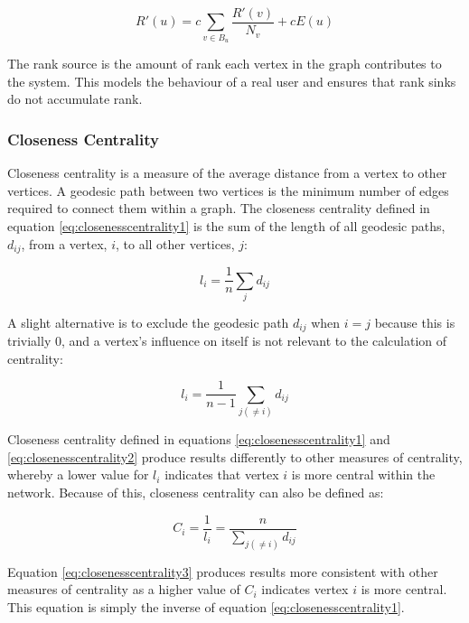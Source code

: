 \begin{equation}
R'(u) = c \sum_{v \in B_u} \frac{R'(v)}{N_v} + cE(u)
\label{eq:pagerank}
\end{equation}

The rank source is the amount of rank each vertex in the graph contributes to the system. This models the behaviour of a real user and ensures that rank sinks do not accumulate rank.

\subsubsection{Closeness Centrality}
Closeness centrality is a measure of the average distance from a vertex to other vertices. A geodesic path between two vertices is the minimum number of edges required to connect them within a graph. The closeness centrality defined in equation \ref{eq:closenesscentrality1} is the sum of the length of all geodesic paths, $d_{ij}$, from a vertex, $i$, to all other vertices, $j$:

\begin{equation}
l_i = \frac{1}{n}\sum_{j} d_{ij}
\label{eq:closenesscentrality1}
\end{equation}

A slight alternative is to exclude the geodesic path $d_{ij}$ when $i = j$ because this is trivially 0, and a vertex's influence on itself is not relevant to the calculation of centrality:

\begin{equation}
l_i = \frac{1}{n-1}\sum_{j(\neq i)} d_{ij}
\label{eq:closenesscentrality2}
\end{equation}

Closeness centrality defined in equations \ref{eq:closenesscentrality1} and \ref{eq:closenesscentrality2} produce results differently to other measures of centrality, whereby a lower value for $l_i$ indicates that vertex $i$ is more central within the network. Because of this, closeness centrality can also be defined as:

\begin{equation}
C_i = \frac{1}{l_i} = \frac{n}{\sum_{j(\neq i)} d_{ij}}
\label{eq:closenesscentrality3}
\end{equation}

Equation \ref{eq:closenesscentrality3} produces results more consistent with other measures of centrality as a higher value of $C_i$ indicates vertex $i$ is more central. This equation is simply the inverse of equation \ref{eq:closenesscentrality1}.

